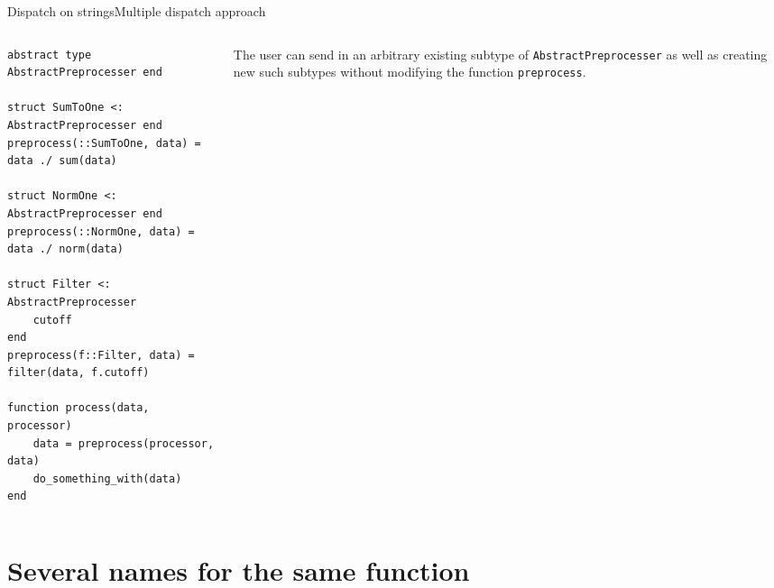 \begin{frame}[fragile]{Dispatch on strings}{Multiple dispatch approach}
    \begin{columns}
 	\begin{column}{0.7\textwidth}

\begin{verbatim}
abstract type AbstractPreprocesser end

struct SumToOne <: AbstractPreprocesser end
preprocess(::SumToOne, data) = data ./ sum(data)

struct NormOne <: AbstractPreprocesser end
preprocess(::NormOne, data) = data ./ norm(data)

struct Filter <: AbstractPreprocesser
    cutoff
end
preprocess(f::Filter, data) = filter(data, f.cutoff)

function process(data, processor)
    data = preprocess(processor, data)
    do_something_with(data)
end
\end{verbatim}
\end{column}
\begin{column}{0.3\textwidth}
     The user can send in an arbitrary existing subtype of
    \texttt{AbstractPreprocesser} as well as creating new such
    subtypes without modifying the function \texttt{preprocess}.
\end{column}
\end{columns}


\end{frame}



\section{Several names for the same function}\label{several-names-for-the-same-function}

